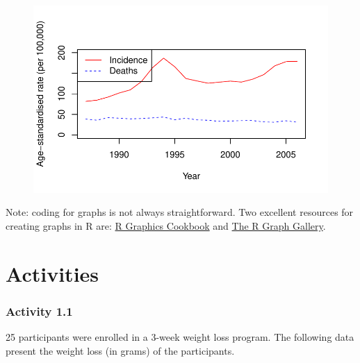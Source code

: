 \documentclass[
  a4paper,
]{memoir}
\begin{document}
\begin{figure}[H]

{\centering \includegraphics{01-intro_files/figure-pdf/unnamed-chunk-110-1.pdf}

}

\end{figure}

Note: coding for graphs is not always straightforward. Two excellent
resources for creating graphs in R are: \href{https://r-graphics.org/}{R
Graphics Cookbook} and \href{https://r-graph-gallery.com/}{The R Graph
Gallery}.

\newpage{}


\hypertarget{activities}{%
\chapter*{Activities}\label{activities}}


\hypertarget{activity-1.1}{%
\subsection*{Activity 1.1}\label{activity-1.1}}

25 participants were enrolled in a 3-week weight loss program. The
following data present the weight loss (in grams) of the participants.

 
  \providecommand{\huxb}[2]{\arrayrulecolor[RGB]{#1}\global\arrayrulewidth=#2pt}
  \providecommand{\huxvb}[2]{\color[RGB]{#1}\vrule width #2pt}
  \providecommand{\huxtpad}[1]{\rule{0pt}{#1}}
  \providecommand{\huxbpad}[1]{\rule[-#1]{0pt}{#1}}
\end{document}
